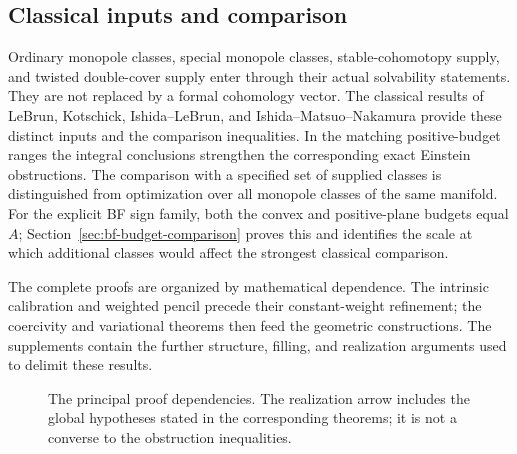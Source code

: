 \documentclass[10pt,a4paper]{article}
\theoremstyle{definition}
\theoremstyle{remark}
\numberwithin{equation}{section}
\begin{document}
\subsection{Classical inputs and comparison}
Ordinary monopole classes, special monopole classes, stable-cohomotopy
supply, and twisted double-cover supply enter through their actual
solvability statements. They are not replaced by a formal cohomology
vector. The classical results of LeBrun, Kotschick, Ishida--LeBrun, and
Ishida--Matsuo--Nakamura provide these distinct inputs and the comparison
inequalities. In the matching positive-budget ranges the integral
conclusions strengthen the corresponding exact Einstein obstructions.
The comparison with a specified set of supplied classes is distinguished
from optimization over all monopole classes of the same manifold.
For the explicit BF sign family, both the convex and positive-plane
budgets equal $A$; Section~\ref{sec:bf-budget-comparison} proves this
and identifies the scale at which additional classes would affect
the strongest classical comparison.

The complete proofs are organized by mathematical dependence. The
intrinsic calibration and weighted pencil precede their constant-weight
refinement; the coercivity and variational theorems then feed the
geometric constructions. The supplements contain the further structure,
filling, and realization arguments used to delimit these results.
\begin{figure}[ht]
\centering
{}
\caption{The principal proof dependencies. The realization arrow includes
the global hypotheses stated in the corresponding theorems; it is not
a converse to the obstruction inequalities.}
\end{figure}
\end{document}
